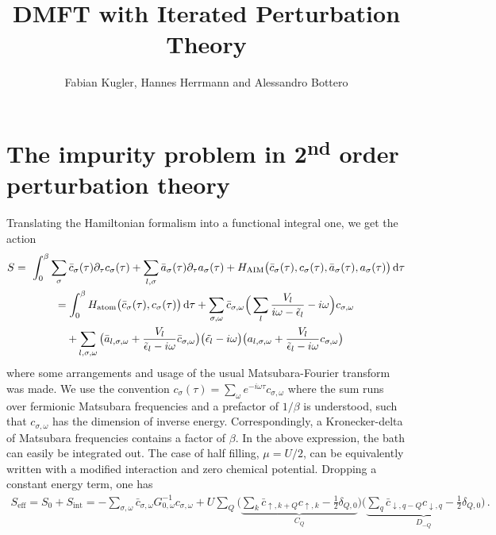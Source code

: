 \documentclass[11pt]{article}
\title{DMFT with Iterated Perturbation Theory}
\author{Fabian Kugler, Hannes Herrmann and Alessandro Bottero}
\begin{document}
\maketitle


\section{The impurity problem in 2\textsuperscript{nd} order perturbation theory}

Translating the Hamiltonian formalism into a functional integral one, we get the action
%
\begin{gather*}
S = \
	\int_0^{\beta} \sum_{\sigma} \bar{c}_{\sigma} (\tau) \partial_{\tau} c_{\sigma} (\tau) 
	+ \sum_{l, \sigma} \bar{a}_{\sigma} (\tau) \partial_{\tau} a_{\sigma} (\tau)
	+ H_{\text{AIM}} \big( \bar{c}_{\sigma} (\tau), c_{\sigma} (\tau), \bar{a}_{\sigma} (\tau), a_{\sigma} (\tau) \big)
	\dif \tau
	\\
	 = \int_0^{\beta}  H_{\text{atom}} \big( \bar{c}_{\sigma} (\tau), c_{\sigma} (\tau) \big)  \dif \tau 
	+ \sum_{\sigma, \omega} \bar{c}_{\sigma, \omega} 
	\Big( \sum_{l} \frac{V_l}{i\omega - \tilde{\epsilon}_l} - i\omega \Big)
	c_{\sigma, \omega} 
	\\
	+ \sum_{l, \sigma, \omega} \big( \bar{a}_{l, \sigma, \omega} + \frac{V_l}{\tilde{\epsilon}_l - i\omega} \bar{c}_{\sigma, \omega} \big) 
	\big( \tilde{\epsilon_l} - i\omega \big)
	\big( a_{l, \sigma, \omega} + \frac{V_l}{\tilde{\epsilon}_l - i\omega} c_{\sigma, \omega} \big) 
\end{gather*}
%
where some arrangements and usage of the usual Matsubara-Fourier transform was made. We use the convention
$
c_{\sigma} (\tau) = \sum_{\omega} e^{-i\omega \tau} c_{\sigma, \omega}
$
where the sum runs over fermionic Matsubara frequencies and a prefactor of $1/ \beta$ is understood, such that $c_{\sigma, \omega}$ has the dimension of inverse energy. Correspondingly, a Kronecker-delta of Matsubara frequencies contains a factor of $\beta$. In the above expression, the bath can easily be integrated out. The case of half filling, $\mu = U/2$, can be equivalently written with a modified interaction and zero chemical potential. Dropping a constant energy term, one has
%
\begin{gather*}
S_{\text{eff}} = S_0 + S_{\text{int}} =
	 - \sum_{\sigma, \omega} \bar{c}_{\sigma, \omega} G_{0, \omega}^{-1}
	c_{\sigma, \omega} 
	+ U \sum_{Q} \Big( 
	\underbrace{
	\sum_{k} \bar{c}_{\uparrow,k+Q} c_{\uparrow,k} - \frac{1}{2} \delta_{Q,0} 
	}_{C_Q}
	\Big) \Big(
	\underbrace{
	\sum_{q} \bar{c}_{\downarrow,q-Q} c_{\downarrow,q} - \frac{1}{2} \delta_{Q,0}
	}_{D_{-Q}}
	\Big)
\, .
\end{gather*}
\end{document}
